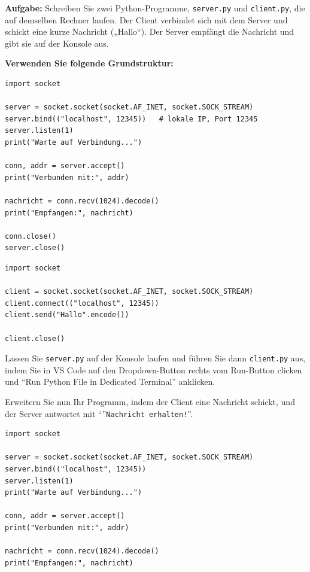 \begin{myexercise}

    \textbf{Aufgabe:} Schreiben Sie zwei Python-Programme, \texttt{server.py} und \texttt{client.py}, die auf demselben Rechner laufen. Der Client verbindet sich mit dem Server und schickt eine kurze Nachricht („Hallo“). Der Server empfängt die Nachricht und gibt sie auf der Konsole aus.

    \textbf{Verwenden Sie folgende Grundstruktur:}

    \begin{lstlisting}[caption={server.py}]
import socket

server = socket.socket(socket.AF_INET, socket.SOCK_STREAM)
server.bind(("localhost", 12345))   # lokale IP, Port 12345
server.listen(1)
print("Warte auf Verbindung...")

conn, addr = server.accept()
print("Verbunden mit:", addr)

nachricht = conn.recv(1024).decode()
print("Empfangen:", nachricht)

conn.close()
server.close()
\end{lstlisting}

    \begin{lstlisting}[caption={client.py}]
import socket

client = socket.socket(socket.AF_INET, socket.SOCK_STREAM)
client.connect(("localhost", 12345))
client.send("Hallo".encode())

client.close()
\end{lstlisting}
    Lassen Sie \texttt{server.py} auf der Konsole laufen und führen Sie dann \texttt{client.py} aus, indem Sie in VS Code auf den Dropdown-Button rechts vom Run-Button clicken und ``Run Python File in Dedicated Terminal'' anklicken.

    Erweitern Sie nun Ihr Programm, indem der Client eine Nachricht schickt, und der Server antwortet mit ``''\texttt{Nachricht erhalten!}''.
    \begin{myanswer}
        \begin{lstlisting}[caption=\texttt{server.py}]
import socket

server = socket.socket(socket.AF_INET, socket.SOCK_STREAM)
server.bind(("localhost", 12345))
server.listen(1)
print("Warte auf Verbindung...")

conn, addr = server.accept()
print("Verbunden mit:", addr)

nachricht = conn.recv(1024).decode()
print("Empfangen:", nachricht)


\end{lstlisting}
\end{myanswer}
\end{myexercise}
